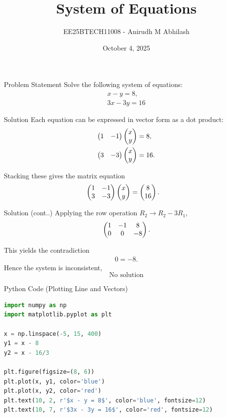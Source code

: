 \documentclass{beamer}
\title{System of Equations}
\author{EE25BTECH11008 - Anirudh M Abhilash}
\date{October 4, 2025}
\begin{document}
\begin{frame}
\titlepage
\end{frame}

\begin{frame}{Problem Statement}
Solve the following system of equations:
\begin{align*}
x - y = 8, \\ 3x - 3y = 16
\end{align*}
\end{frame}

\begin{frame}{Solution}
Each equation can be expressed in vector form as a dot product:
\begin{align}
\begin{pmatrix}1 & -1\end{pmatrix}\begin{pmatrix}x \\ y\end{pmatrix} &= 8, \\
\begin{pmatrix}3 & -3\end{pmatrix}\begin{pmatrix}x \\ y\end{pmatrix} &= 16.
\end{align}

Stacking these gives the matrix equation
\begin{align}
\begin{pmatrix}1 & -1 \\ 3 & -3\end{pmatrix}\begin{pmatrix}x \\ y\end{pmatrix} &= \begin{pmatrix}8 \\ 16\end{pmatrix}.
\end{align}
\end{frame}

\begin{frame}{Solution (cont..)}
Applying the row operation $R_2 \to R_2 - 3R_1$,
\begin{align}
\begin{pmatrix}1 & -1 & 8 \\ 0 & 0 & -8\end{pmatrix}.
\end{align}

This yields the contradiction
\begin{align}
0 = -8.
\end{align}
Hence the system is inconsistent,
\[
\boxed{\text{No solution}}
\]

\end{frame}

\begin{frame}[fragile]{Python Code (Plotting Line and Vectors)}
\begin{lstlisting}[language=Python]
import numpy as np
import matplotlib.pyplot as plt

x = np.linspace(-5, 15, 400)
y1 = x - 8
y2 = x - 16/3

plt.figure(figsize=(8, 6))
plt.plot(x, y1, color='blue')
plt.plot(x, y2, color='red')
plt.text(10, 2, r'$x - y = 8$', color='blue', fontsize=12)
plt.text(10, 7, r'$3x - 3y = 16$', color='red', fontsize=12)

\end{lstlisting}
\end{frame}
\end{document}
